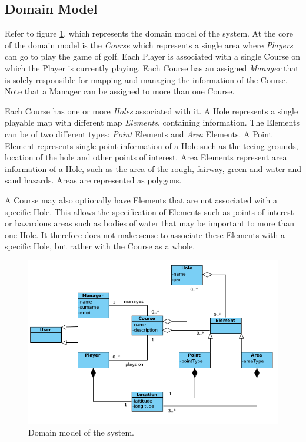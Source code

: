 \documentclass{article}
\begin{document}
    \subsection{Domain Model}

    Refer to figure \ref{fig:domainmodel}, which represents the domain model of
    the system. At the core of the domain model is the \textit{Course} which
    represents a single area where \textit{Players} can go to play the game of
    golf. Each Player is associated with a single Course on which the Player is
    currently playing. Each Course has an assigned \textit{Manager} that is
    solely responsible for mapping and managing the information of the Course.
    Note that a Manager can be assigned to more than one Course.

    Each Course has one or more \textit{Holes} associated with it. A Hole
    represents a single playable map with different map \textit{Elements},
    containing information. The Elements can be of two different types:
    \textit{Point} Elements and \textit{Area} Elements. A Point Element
    represents single-point information of a Hole such as the teeing grounds,
    location of the hole and other points of interest. Area Elements represent
    area information of a Hole, such as the area of the rough, fairway, green
    and water and sand hazards. Areas are represented as polygons.

    A Course may also optionally have Elements that are not associated with a
    specific Hole. This allows the specification of Elements such as points of
    interest or hazardous areas such as bodies of water that may be important
    to more than one Hole. It therefore does not make sense to associate these
    Elements with a specific Hole, but rather with the Course as a whole.
    
    \begin{figure}[h]
    	\centering
    	\includegraphics[scale=0.5]{DomainModel}
        \caption{Domain model of the system.}
        \label{fig:domainmodel}
    \end{figure}
\end{document}
